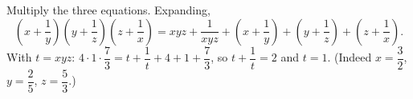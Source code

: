 Multiply the three equations. Expanding,
\[\left(x+\dfrac1y\right)\left(y+\dfrac1z\right)\left(z+\dfrac1x\right)=xyz+\dfrac1{xyz}+\left(x+\dfrac1y\right)+\left(y+\dfrac1z\right)+\left(z+\dfrac1x\right).\]
With $t=xyz$: $4\cdot1\cdot\dfrac73=t+\dfrac1t+4+1+\dfrac73$, so $t+\dfrac1t=2$ and $t=\boxed{1}$. (Indeed $x=\dfrac32$, $y=\dfrac25$, $z=\dfrac53$.)
